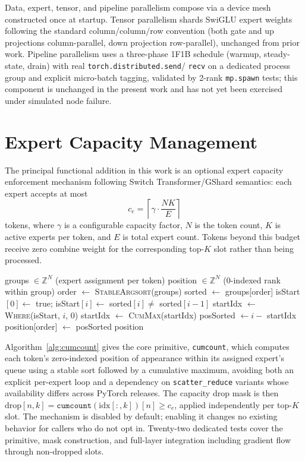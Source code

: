 \documentclass[conference]{IEEEtran}
\begin{document}
Data, expert, tensor, and pipeline parallelism compose via a device mesh
constructed once at startup. Tensor parallelism shards SwiGLU expert
weights following the standard column/column/row convention (both gate and
up projections column-parallel, down projection row-parallel), unchanged
from prior work. Pipeline parallelism uses a three-phase 1F1B schedule
(warmup, steady-state, drain) with real \texttt{torch.distributed.send}/
\texttt{recv} on a dedicated process group and explicit micro-batch
tagging, validated by 2-rank \texttt{mp.spawn} tests; this component is
unchanged in the present work and has not yet been exercised under
simulated node failure.

\section{Expert Capacity Management}
\label{sec:capacity}

The principal functional addition in this work is an optional expert
capacity enforcement mechanism following Switch Transformer/GShard
semantics: each expert accepts at most
\begin{equation}
c_e = \left\lceil \gamma \cdot \frac{N K}{E} \right\rceil
\end{equation}
tokens, where $\gamma$ is a configurable capacity factor, $N$ is the token
count, $K$ is active experts per token, and $E$ is total expert count.
Tokens beyond this budget receive zero combine weight for the
corresponding top-$K$ slot rather than being processed.

\begin{algorithm}[t]
\caption{\texttt{cumcount}: position of appearance within group}
\label{alg:cumcount}
\begin{algorithmic}[1]
\REQUIRE groups $\in \mathbb{Z}^N$ (expert assignment per token)
\ENSURE position $\in \mathbb{Z}^N$ (0-indexed rank within group)
\STATE order $\gets$ \textsc{StableArgsort}(groups)
\STATE sorted $\gets$ groups[order]
\STATE isStart$[0] \gets$ true; isStart$[i] \gets$ sorted$[i] \ne$ sorted$[i{-}1]$
\STATE startIdx $\gets$ \textsc{Where}(isStart, $i$, 0)
\STATE startIdx $\gets$ \textsc{CumMax}(startIdx)
\STATE posSorted $\gets i - $ startIdx
\STATE position[order] $\gets$ posSorted
\RETURN position
\end{algorithmic}
\end{algorithm}

Algorithm~\ref{alg:cumcount} gives the core primitive, \texttt{cumcount},
which computes each token's zero-indexed position of appearance within its
assigned expert's queue using a stable sort followed by a cumulative
maximum, avoiding both an explicit per-expert loop and a dependency on
\texttt{scatter\_reduce} variants whose availability differs across
PyTorch releases. The capacity drop mask is then
$\text{drop}[n,k] = \texttt{cumcount}(\text{idx}[:,k])[n] \ge c_e$,
applied independently per top-$K$ slot. The mechanism is disabled by
default; enabling it changes no existing behavior for callers who do not
opt in. Twenty-two dedicated tests cover the primitive, mask construction,
and full-layer integration including gradient flow through non-dropped
slots.
\end{document}
